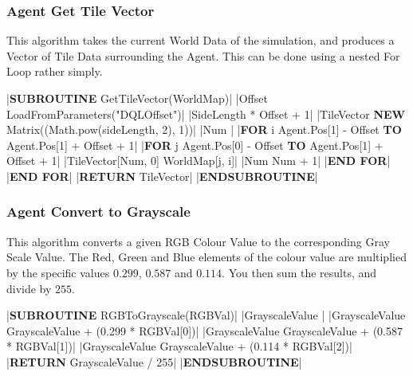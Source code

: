 \begin{flushleft}
                \vspace{0.5cm}
            \subsubsection{Agent Get Tile Vector}
                This algorithm takes the current World Data of the simulation, and produces a Vector of Tile Data surrounding the Agent. This can
                be done using a nested For Loop rather simply.

                \vspace{0.2cm}
                \begin{pseudocode}
|\textbf{SUBROUTINE} GetTileVector(WorldMap)|
    |Offset \leftarrow LoadFromParameters("DQLOffset")|
    |SideLength  * Offset + 1|
    |TileVector \leftarrow \textbf{NEW} Matrix((Math.pow(sideLength, 2), 1))|
    |Num |
    |\textbf{FOR} i \leftarrow Agent.Pos[1] - Offset \textbf{TO} Agent.Pos[1] + Offset + 1|
        |\textbf{FOR} j \leftarrow Agent.Pos[0] - Offset \textbf{TO} Agent.Pos[1] + Offset + 1|
            |TileVector[Num, 0] \leftarrow WorldMap[j, i]|
            |Num \leftarrow Num + 1|
        |\textbf{END FOR}|
    |\textbf{END FOR}|
    |\textbf{RETURN} TileVector|
|\textbf{ENDSUBROUTINE}|
                \end{pseudocode}
                
                \vspace{0.5cm}
            \subsubsection{Agent Convert to Grayscale}
                This algorithm converts a given RGB Colour Value to the corresponding Gray Scale Value. The Red, Green and Blue elements of
                the colour value are multiplied by the specific values $0.299$, $0.587$ and $0.114$. You then sum the results, and divide by 
                $255$.

                \vspace{0.2cm}
                \begin{pseudocode}
|\textbf{SUBROUTINE} RGBToGrayscale(RGBVal)|
    |GrayscaleValue |
    |GrayscaleValue \leftarrow GrayscaleValue + (0.299 * RGBVal[0])|
    |GrayscaleValue \leftarrow GrayscaleValue + (0.587 * RGBVal[1])|
    |GrayscaleValue \leftarrow GrayscaleValue + (0.114 * RGBVal[2])|
    |\textbf{RETURN} GrayscaleValue / 255|
|\textbf{ENDSUBROUTINE}|
                \end{pseudocode}


\end{flushleft}
